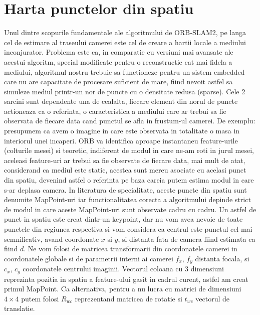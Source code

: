\documentclass[12pt,a4paper]{report}
\begin{document}
\section{Harta punctelor din spatiu}
Unul dintre scopurile fundamentale ale algoritmului de ORB-SLAM2, pe langa cel 
de estimare al traseului camerei este cel de creare a hartii locale a mediului
inconjurator. Problema este ca, in comparatie cu versiuni mai avansate ale
acestui algoritm, special modificate pentru o reconstructie cat mai fidela a mediului,
algoritmul nostru trebuie sa functioneze pentru un sistem embedded care nu are 
capacitate de procesare suficient de mare, fiind nevoit astfel sa simuleze mediul 
printr-un nor de puncte cu o densitate redusa (sparse). Cele 2 sarcini sunt 
dependente una de cealalta, fiecare element din norul de puncte actioneaza ca
o referinta, o caracteristica a mediului care ar trebui sa fie observata de fiecare 
data cand punctul se afla in frustum-ul camerei. De exemplu: presupunem ca avem
o imagine in care este observata in totalitate o masa in interiorul unei incaperi. 
ORB va identifica aproape instantaneu feature-urile (colturile mesei) si teoretic,
indiferent de modul in care ne-am roti in jurul mesei, aceleasi feature-uri
ar trebui sa fie observate de fiecare data, mai mult de atat, considerand ca mediul 
este static, acestea sunt mereu asociate cu acelasi punct din spatiu, devenind astfel 
o referinta pe baza careia putem estima modul in care s-ar deplasa camera. 
In literatura de specialitate, aceste puncte din spatiu sunt  denumite MapPoint-uri 
iar functionalitatea corecta a algoritmului depinde strict de 
modul in care aceste MapPoint-uri sunt observate cadru cu cadru. Un astfel de punct 
in spatiu este creat dintr-un keypoint, dar nu vom avea nevoie de toate punctele din 
regiunea respectiva si vom considera ca centrul este punctul cel mai semnificativ,  
avand coordonate \(x\) si \(y\), si distanta fata de camera fiind estimata ca fiind 
\(d\). Ne vom folosi de matricea transformarii din coordonatele camerei
in coordonatele globale si de parametrii interni ai camerei \(f_x\), \(f_y\) 
distanta focala, si \(c_x\), \(c_y\) coordonatele centrului imaginii.
Vectorul coloana cu 3 dimensiuni reprezinta pozitia in spatiu a feature-ului gasit
in cadrul curent, astfel am creat primul MapPoint. Ca alternativa,
pentru a nu lucra cu matrici de dimensiuni $ 4 \times 4 $ putem folosi \(R_{wc}\) reprezentand
matricea de rotatie si \(t_{wc}\) vectorul de translatie.
\end{document}
